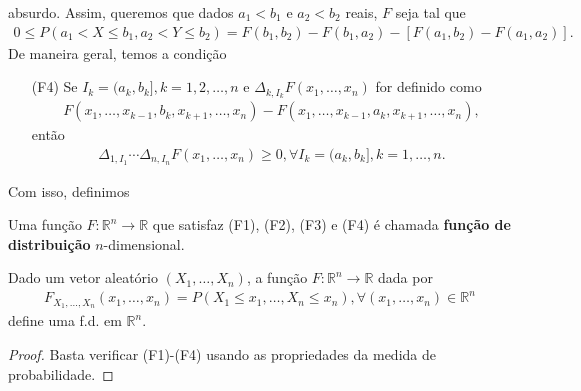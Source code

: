 \documentclass[../Notas.tex]{subfiles}
\begin{document}
absurdo. Assim, queremos que dados $a_1 < b_1$ e $a_2 < b_2$ reais, $F$ seja tal que
\begin{align*}
    0\leq P(a_1 < X\leq b_1, a_2 < Y\leq b_2) = F(b_1, b_2) - F(b_1, a_2) - [F(a_1, b_2) - F(a_1, a_2)].
\end{align*}
De maneira geral, temos a condição
\begin{itemize}
    \item[(F4)] Se $I_k = (a_k, b_k], k = 1,2,\dots,n$ e $\Delta_{k, I_k}F(x_1, \dots, x_n)$ for definido como
    \begin{align*}
        F(x_1, \dots, x_{k-1}, b_k, x_{k+1}, \dots, x_n) - F(x_1, \dots, x_{k-1}, a_k, x_{k+1}, \dots, x_n),
    \end{align*}
    então
    \begin{align*}
        \Delta_{1, I_1}\cdots\Delta_{n,I_n}F(x_1, \dots, x_n) \geq 0, \forall I_k = (a_k,b_k], k = 1,\dots,n.
    \end{align*}
\end{itemize}
Com isso, definimos
\begin{definition}
Uma função $F:\mathbb{R}^n\to\mathbb{R}$ que satisfaz (F1), (F2), (F3) e (F4) é chamada \textbf{função de distribuição} $n$-dimensional.
\end{definition}

\begin{proposition}
Dado um vetor aleatório $(X_1, \dots, X_n)$, a função $F:\mathbb{R}^n\to\mathbb{R}$ dada por
\begin{align*}
    F_{X_1, \dots, X_n}(x_1, \dots, x_n) = P(X_1\leq x_1, \dots, X_n\leq x_n), \forall (x_1, \dots, x_n)\in\mathbb{R}^n
\end{align*}
define uma f.d. em $\mathbb{R}^n$.
\end{proposition}

\begin{proof}
Basta verificar (F1)-(F4) usando as propriedades da medida de probabilidade.
\end{proof}
\end{document}
